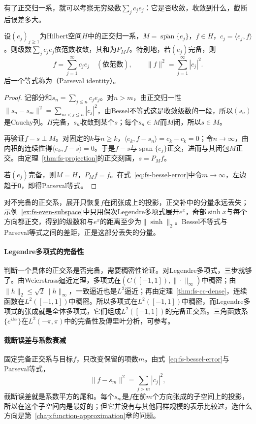 有了正交归一系，就可以考察无穷级数$\sum_jc_je_j$：它是否收敛，收敛到什么，截断后误差多大。

\begin{theorem}[正交展开与Parseval等式]
\label{thm:fs-parseval}
设$(e_j)_{j\geq1}$为Hilbert空间$H$中的正交归一系，$M=\overline{\operatorname{span}}\{e_j\}$，$f\in H$，$c_j=\langle e_j,f\rangle$。则级数$\sum_jc_je_j$依范数收敛，其和为$P_Mf$。特别地，若$(e_j)$完备，则
\[
 f=\sum_{j=1}^\infty c_je_j\quad(\text{依范数}),\qquad \|f\|^2=\sum_{j=1}^\infty|c_j|^2 .
\]
后一个等式称为（Parseval identity）。
\end{theorem}

\begin{proof}
记部分和$s_n=\sum_{j\leq n}c_je_j$。对$n>m$，由正交归一性$\|s_n-s_m\|^2=\sum_{m<j\leq n}|c_j|^2$，由Bessel不等式这是收敛级数的一段，所以$(s_n)$是Cauchy列。$H$完备，$s_n$收敛到某个$s$；每个$s_n\in M$而$M$闭，所以$s\in M$。

再验证$f-s\perp M$。对固定的$k$与$n\geq k$，$\langle e_k,f-s_n\rangle=c_k-c_k=0$；令$n\to\infty$，由内积的连续性得$\langle e_k,f-s\rangle=0$。于是$f-s$与$\operatorname{span}\{e_j\}$正交，进而与其闭包$M$正交。由定理~\ref{thm:fs-projection}的正交刻画，$s=P_Mf$。

若$(e_j)$完备，则$M=H$，$P_Mf=f$。在式~\eqref{eq:fs-bessel-error}中令$m\to\infty$，左边趋于$0$，即得Parseval等式。
\end{proof}

对不完备的正交系，展开只恢复$f$在闭张成上的投影，正交补中的分量永远丢失；示例~\ref{ex:fs-even-subspace}中只用偶次Legendre多项式展开$e^x$，奇部$\sinh x$与每个方向都正交，得到的级数和与$e^x$的距离至少为$\|\sinh\|_2$。Bessel不等式与Parseval等式之间的差距，正是这部分丢失的分量。

\paragraph{Legendre多项式的完备性}
判断一个具体的正交系是否完备，需要稠密性论证。对Legendre多项式，三步就够了。由Weierstrass逼近定理，多项式在$(C([-1,1]),\|\cdot\|_\infty)$中稠密；由$\|h\|_2\leq\sqrt2\|h\|_\infty$，一致逼近也是$L^2$逼近；再由定理~\ref{thm:fs-cc-dense}，连续函数在$L^2([-1,1])$中稠密。所以多项式在$L^2([-1,1])$中稠密，而Legendre多项式的张成就是全体多项式，它们组成$L^2([-1,1])$的完备正交系。三角函数系$\{e^{ikx}\}$在$L^2(-\pi,\pi)$中的完备性及傅里叶分析，可参考。

\paragraph{截断误差与系数衰减}
固定完备正交系与目标$f$，只改变保留的项数$m$。由式~\eqref{eq:fs-bessel-error}与Parseval等式，
\begin{equation}
 \|f-s_m\|^2=\sum_{j>m}|c_j|^2 ,
 \label{eq:fs-truncation-tail}
\end{equation}
截断误差就是系数平方的尾和。每个$s_m$是$f$在前$m$个方向张成的子空间上的投影，所以在这个子空间内是最好的；但它并没有与其他同样规模的表示比较过，选什么方向是第~\ref{chap:function-approximation}章的问题。


